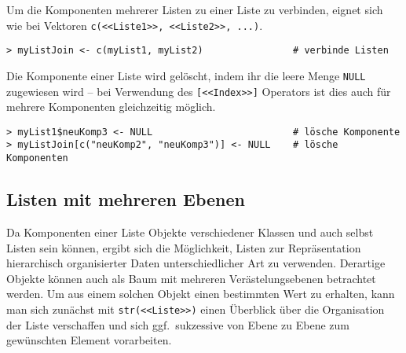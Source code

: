 Um die Komponenten mehrerer Listen zu einer Liste zu verbinden, eignet sich wie bei Vektoren \lstinline!c(<<Liste1>>, <<Liste2>>, ...)!.
\begin{lstlisting}
> myListJoin <- c(myList1, myList2)                # verbinde Listen
\end{lstlisting}

Die Komponente einer Liste wird gelöscht, indem ihr die leere Menge \lstinline!NULL! zugewiesen wird -- bei Verwendung des \lstinline![<<Index>>]! Operators ist dies auch für mehrere Komponenten gleichzeitig möglich.
\begin{lstlisting}
> myList1$neuKomp3 <- NULL                         # lösche Komponente
> myListJoin[c("neuKomp2", "neuKomp3")] <- NULL    # lösche Komponenten
\end{lstlisting}

\subsection{Listen mit mehreren Ebenen}
\label{sec:unlist}

Da Komponenten einer Liste Objekte verschiedener Klassen und auch selbst Listen sein können, ergibt sich die Möglichkeit, Listen zur Repräsentation hierarchisch organisierter Daten unterschiedlicher Art zu verwenden. Derartige Objekte können auch als Baum mit mehreren Verästelungsebenen betrachtet werden. Um aus einem solchen Objekt einen bestimmten Wert zu erhalten, kann man sich zunächst mit \lstinline!str(<<Liste>>)! einen Überblick über die Organisation der Liste verschaffen und sich ggf.\ sukzessive von Ebene zu Ebene zum gewünschten Element vorarbeiten.

